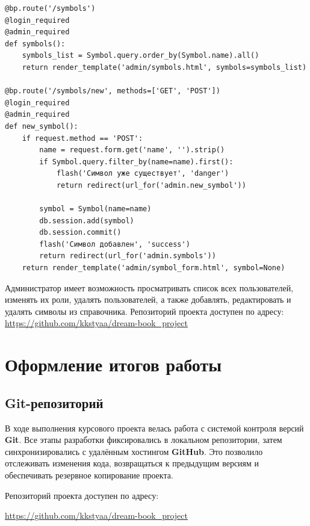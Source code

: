\documentclass[14pt, a4paper]{extarticle}
\begin{document}
\begin{lstlisting}[caption={Управление символами в админ-панели}, label={lst:admin}]
@bp.route('/symbols')
@login_required
@admin_required
def symbols():
    symbols_list = Symbol.query.order_by(Symbol.name).all()
    return render_template('admin/symbols.html', symbols=symbols_list)

@bp.route('/symbols/new', methods=['GET', 'POST'])
@login_required
@admin_required
def new_symbol():
    if request.method == 'POST':
        name = request.form.get('name', '').strip()
        if Symbol.query.filter_by(name=name).first():
            flash('Символ уже существует', 'danger')
            return redirect(url_for('admin.new_symbol'))
        
        symbol = Symbol(name=name)
        db.session.add(symbol)
        db.session.commit()
        flash('Символ добавлен', 'success')
        return redirect(url_for('admin.symbols'))
    return render_template('admin/symbol_form.html', symbol=None)
\end{lstlisting}

Администратор имеет возможность просматривать список всех пользователей, изменять их роли, удалять пользователей, а также добавлять, редактировать и удалять символы из справочника. Репозиторий проекта доступен по адресу: \url{https://github.com/kkstyaa/dream-book_project}
\newpage


\section{Оформление итогов работы}

\subsection{Git-репозиторий}

В ходе выполнения курсового проекта велась работа с системой контроля версий \textbf{Git}. Все этапы разработки фиксировались в локальном репозитории, затем синхронизировались с удалённым хостингом \textbf{GitHub}. Это позволило отслеживать изменения кода, возвращаться к предыдущим версиям и обеспечивать резервное копирование проекта.

Репозиторий проекта доступен по адресу:
\begin{center}
    \url{https://github.com/kkstyaa/dream-book_project}
\end{center}
\end{document}
